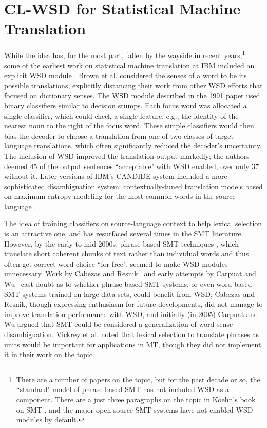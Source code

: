 \section{CL-WSD for Statistical Machine Translation}
\label{sec:clwsd-smt}
While the idea has, for the most part, fallen by the wayside in recent
years,\footnote{There are a number of papers on the topic, but for the past
decade or so, the ``standard" model of phrase-based SMT has not included WSD as
a component. There are a just three paragraphs on the topic in Koehn's book on
SMT \cite[\S 5.3.6]{koehn2010statistical}, and the major open-source SMT
systems have not enabled WSD modules by default.}
some of the earliest work on statistical machine translation at IBM included
an explicit WSD module \cite{Brown91word-sensedisambiguation}.
Brown et al. considered the senses of a word to be its possible translations,
explicitly distancing their work from other WSD efforts that focused on
dictionary senses.
The WSD module described in the 1991 paper used binary classifiers similar to
decision stumps. Each focus word was allocated a single classifier, which could
check a single feature, e.g., the identity of the nearest noun to the right of
the focus word.
These simple classifiers would then bias the decoder to choose a
translation from one of two classes of target-language translations,
which often significantly reduced the decoder's uncertainty. The inclusion of
WSD improved the translation output markedly; the authors deemed 45 of the
output sentences ``acceptable" with WSD enabled, over only 37 without it.
Later versions of IBM's CANDIDE system included a more sophisticated
disambiguation system: contextually-tuned translation models based on
maximum entropy modeling for the most common words in the source language
\cite{Berger:1994:CSM:1075812.1075844}.

The idea of training classifiers on source-language context to help lexical
selection is an attractive one, and has resurfaced several times in the SMT
literature. However, by the early-to-mid 2000s, phrase-based SMT techniques
\cite{koehn2003statistical}, which translate short coherent chunks of text
rather than individual words and thus often get correct word choice ``for
free", seemed to make WSD modules unnecessary.
Work by Cabezas and
Resnik~\cite{cabezas2005using} and early attempts by Carpuat and
Wu~\cite{carpuat-wu:2005:ACL} cast doubt as to whether phrase-based SMT
systems, or even word-based SMT systems trained on large data sets, could
benefit from WSD; Cabezas and Resnik, though expressing enthusiasm for future
developments, did not manage to improve translation performance with WSD, and
initially (in 2005) Carpuat and Wu argued that SMT could be considered a
generalization of word-sense disambiguation. Vickrey et al.
\cite{vickrey-EtAl:2005:HLTEMNLP} noted that lexical selection to translate
phrases as units would be important for applications in MT, though they did not
implement it in their work on the topic.

